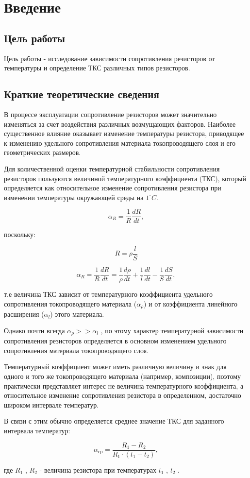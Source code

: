 \section{Введение}

\subsection{Цель работы}

Цель работы - исследование зависимости сопротивления резисторов от температуры и определение ТКС различных типов резисторов.

\subsection{Краткие теоретические сведения}

В процессе эксплуатации сопротивление резисторов может значительно изменяться за счет воздействия различных возмущающих факторов. Наиболее существенное влияние оказывает изменение температуры резистора, приводящее к изменению удельного сопротивления материала токопроводящего слоя и его геометрических размеров.

Для количественной оценки температурной стабильности сопротивления резисторов пользуются величиной температурного коэффициента (ТКС), который определяется как относительное изменение сопротивления резистора при изменении температуры окружающей среды на $1^\circ C$.

\[
\alpha_R = \frac{1}{R} \frac{dR}{dt},
\]

поскольку:

\[
R = \rho \frac{l}{S}
\]


\[
\alpha_R = \frac{1}{R} \frac{dR}{dt} = \frac{1}{\rho} \frac{d \rho}{dt} + \frac{1}{l} \frac{dl}{dt} - \frac{1}{S} \frac{dS}{dt},
\]

т.е величина ТКС зависит от температурного коэффициента удельного сопротивления токопроводящего материала ($\alpha_\rho$) и от коэффициента линейного расширения ($\alpha_l$) этого материала.

Однако почти всегда $\alpha_\rho >> \alpha_l$ , по этому характер температурной зависимости сопротивления резисторов определяется в основном изменением удельного сопротивления материала токопроводящего слоя.

Температурный коэффициент может иметь различную величину и знак для одного и того же токопроводящего материала (например, композиции), поэтому практически представляет интерес не величина температурного коэффициента, а относительное изменение сопротивления резистора в определенном, достаточно широком интервале температур.

В связи с этим обычно определяется среднее значение ТКС для заданного интервала температур:

\[
\alpha_{ср}=\frac{R_1-R_2}{R_1 \cdot (t_1-t_2)},
\]

где $R_1$ , $R_2$ - величина резистора при температурах $t_1$ , $t_2$ .
